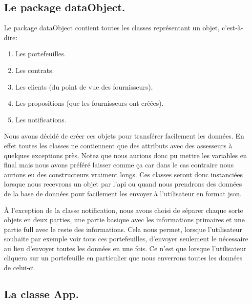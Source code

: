 \subsection{Le package dataObject.}

\begin{flushleft}
Le package dataObject contient toutes les classes représentant un objet, c'est-à-dire:
\end{flushleft}

\begin{enumerate}[-]
\item Les portefeuilles.
\item Les contrats.
\item Les clients (du point de vue des fournisseurs).
\item Les propositions (que les fournisseurs ont créées).
\item Les notifications.
\end{enumerate}

\begin{flushleft}
Nous avons décidé de créer ces objets pour transférer facilement les données. En effet toutes les classes ne contiennent que des attributs avec des assesseurs à quelques exceptions près. Notez que nous aurions donc pu mettre les variables en final mais nous avons préféré laisser comme ça car dans le cas contraire nous aurions eu des constructeurs vraiment longs. Ces classes seront donc instanciées lorsque nous recevrons un objet par l'api ou quand nous prendrons des données de la base de données pour facilement les envoyer à l'utilisateur en format json.
\end{flushleft}

\begin{flushleft}
À l'exception de la classe notification, nous avons choisi de séparer chaque sorte objets en deux parties, une partie basique avec les informations primaires et une partie full avec le reste des informations. Cela nous permet, lorsque l'utilisateur souhaite par exemple voir tous ces portefeuilles, d'envoyer seulement le nécessaire au lieu d'envoyer toutes les données en une fois. Ce n'est que lorsque l'utilisateur cliquera sur un portefeuille en particulier que nous enverrons toutes les données de celui-ci.
\end{flushleft}

\subsection{La classe App.}

